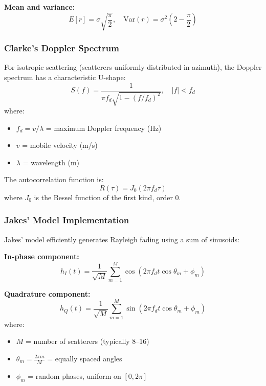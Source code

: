 \textbf{Mean and variance:}
\begin{equation}
E[r] = \sigma\sqrt{\frac{\pi}{2}}, \quad \mathrm{Var}(r) = \sigma^2\left(2 - \frac{\pi}{2}\right)
\end{equation}

\subsubsection{Clarke's Doppler Spectrum}

For isotropic scattering (scatterers uniformly distributed in azimuth), the Doppler spectrum has a characteristic U-shape:
\begin{equation}
S(f) = \frac{1}{\pi f_d \sqrt{1 - (f/f_d)^2}}, \quad |f| < f_d
\end{equation}
where:
\begin{itemize}
\item $f_d = v/\lambda$ = maximum Doppler frequency (Hz)
\item $v$ = mobile velocity (m/s)
\item $\lambda$ = wavelength (m)
\end{itemize}

The autocorrelation function is:
\begin{equation}
R(\tau) = J_0(2\pi f_d \tau)
\end{equation}
where $J_0$ is the Bessel function of the first kind, order 0.

\subsubsection{Jakes' Model Implementation}

Jakes' model efficiently generates Rayleigh fading using a sum of sinusoids:

\textbf{In-phase component:}
\begin{equation}
h_I(t) = \frac{1}{\sqrt{M}} \sum_{m=1}^{M} \cos(2\pi f_d t \cos\theta_m + \phi_m)
\end{equation}

\textbf{Quadrature component:}
\begin{equation}
h_Q(t) = \frac{1}{\sqrt{M}} \sum_{m=1}^{M} \sin(2\pi f_d t \cos\theta_m + \phi_m)
\end{equation}
where:
\begin{itemize}
\item $M$ = number of scatterers (typically 8--16)
\item $\theta_m = \frac{2\pi m}{M}$ = equally spaced angles
\item $\phi_m$ = random phases, uniform on $[0, 2\pi]$
\end{itemize}

